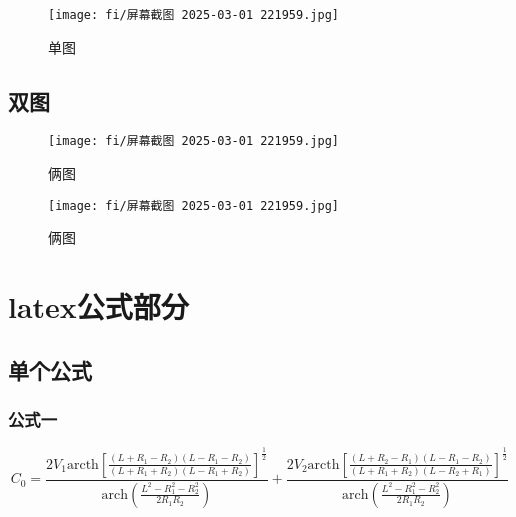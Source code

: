 \documentclass[12pt,a4paper]{article}%
\begin{document}
\begin{figure}[H]%
	\centering
	\begin{minipage}{0.83\textwidth}%
		\centering
		\texttt{[image: fi/屏幕截图 2025-03-01 221959.jpg]}%
		\caption{\fontsize{10pt}{15pt}\selectfont 单图}%
	\end{minipage}
\end{figure}

\subsection{双图}
\begin{figure}[H]%
	\centering
	\begin{minipage}{0.48\textwidth}
		\centering
		\texttt{[image: fi/屏幕截图 2025-03-01 221959.jpg]}
		\caption{\fontsize{10pt}{15pt}\selectfont 俩图}
	\end{minipage}
	\hspace{0cm}%
	\hfill%
	\begin{minipage}{0.48\textwidth}
		\centering
		\texttt{[image: fi/屏幕截图 2025-03-01 221959.jpg]}
		\caption{\fontsize{10pt}{15pt}\selectfont 俩图}
	\end{minipage}
\end{figure}


\section{latex公式部分}
\subsection{单个公式}
    \subsubsection{公式一}

    \begin{equation}%
        C_0=\frac{2V_1\text{arcth}\left[ \frac{\left( L+R_1-R_2 \right) \left( L-R_1-R_2 \right)}{\left( L+R_1+R_2 \right) \left( L-R_1+R_2 \right)} \right] ^{\frac{1}{2}}}{\text{arch}\left( \frac{L^2-R_{1}^{2}-R_{2}^{2}}{2R_1R_2} \right)}+\frac{2V_2\text{arcth}\left[ \frac{\left( L+R_2-R_1 \right) \left( L-R_1-R_2 \right)}{\left( L+R_1+R_2 \right) \left( L-R_2+R_1 \right)} \right] ^{\frac{1}{2}}}{\text{arch}\left( \frac{L^2-R_{1}^{2}-R_{2}^{2}}{2R_1R_2} \right)}
    \end{equation}
\end{document}
